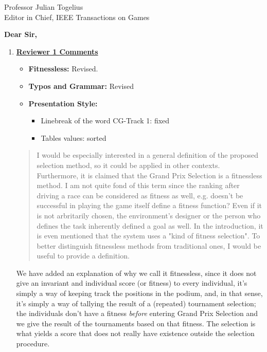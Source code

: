 \documentclass[10pt]{letter} %
\begin{document}

\begin{letter}{Professor Julian Togelius \\ Editor in Chief, IEEE Transactions on Games} %


\opening{\textbf{Dear Sir,}}


\begin{enumerate}
\item {\bf \underline{ Reviewer 1 Comments}}\\
	\begin{itemize}
		\item {\bf Fitnessless:} Revised.
		\item {\bf Typos and Grammar:} Revised
		\item  {\bf Presentation Style:}
		\begin{itemize}
			\item Linebreak of the word CG-Track 1:  fixed
			\item Tables values: sorted
		\end{itemize}
              \end{itemize}
\begin{quote}
I would be especially interested in a general definition of the
proposed selection method, so it could be applied in other
contexts. Furthermore, it is claimed that the Grand Prix Selection is
a fitnessless method. I am not quite fond of this term since the
ranking after driving a race can be considered as fitness as well,
e.g. doesn't be successful in playing the game itself define a fitness
function? Even if it is not arbritarily chosen, the environment's
designer or the person who defines the task inherently defined a goal
as well. In the introduction, it is even mentioned that the system
uses a "kind of fitness selection". To better distinguish fitnessless
methods from traditional ones, I would be useful to provide a
definition.
\end{quote}

We have added an explanation of why we call it fitnessless, since it
does not give an invariant and individual score (or fitness) to every
individual, it's simply a way of keeping track the positions in the
podium, and, in that sense, it's simply a way of tallying the result
of a (repeated) tournament selection; the individuals don't have a
fitness {\em before} entering Grand Prix Selection and we give the
result of the tournaments based on that fitness. The selection is what
yields a score that does not really have existence outside the
selection procedure.


\end{enumerate}
\end{letter}
\end{document}
